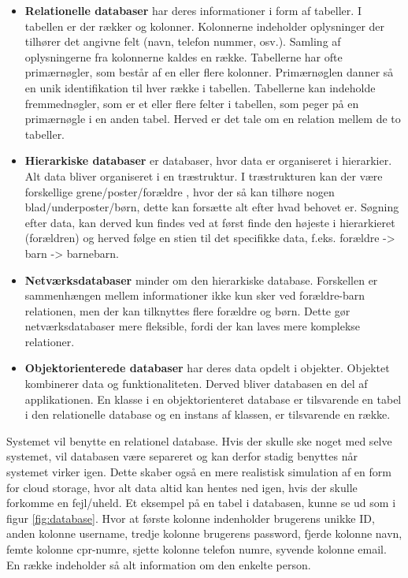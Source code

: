 \begin{itemize}
\item \textbf{Relationelle databaser} har deres informationer i form af tabeller. I tabellen er der rækker og kolonner. Kolonnerne indeholder oplysninger der tilhører det angivne felt (navn, telefon nummer, osv.). Samling af oplysningerne fra kolonnerne kaldes en række. Tabellerne har ofte primærnøgler, som består af en eller flere kolonner. Primærnøglen danner så en unik identifikation til hver række i tabellen. Tabellerne kan indeholde fremmednøgler, som er et eller flere felter i tabellen, som peger på en primærnøgle i en anden tabel. Herved er det tale om en relation mellem de to tabeller. \citep{reledata, database}
\item \textbf{Hierarkiske databaser} er databaser, hvor data er organiseret i hierarkier. Alt data bliver organiseret i en træstruktur. I træstrukturen kan der være forskellige grene/poster/forældre , hvor der så kan tilhøre nogen blad/underposter/børn, dette kan forsætte alt efter hvad behovet er. Søgning efter data, kan derved kun findes ved at først finde den højeste i hierarkieret (forældren) og herved følge en stien til det specifikke data, f.eks. forældre -> barn -> barnebarn. \citep{hierdata, database} 
\item \textbf{Netværksdatabaser} minder om den hierarkiske database. Forskellen er sammenhængen mellem informationer ikke kun sker ved forældre-barn relationen, men der kan tilknyttes flere forældre og børn. Dette gør netværksdatabaser mere fleksible, fordi der kan laves mere komplekse relationer. \citep{database, netdata}
\item \textbf{Objektorienterede databaser} har deres data opdelt i objekter. Objektet kombinerer data og funktionaliteten. Derved bliver databasen en del af applikationen. En klasse i en objektorienteret database er tilsvarende en tabel i den relationelle database og en instans af klassen, er tilsvarende en række. \citep{database}
\end{itemize}

Systemet vil benytte en relationel database. Hvis der skulle ske noget med selve systemet, vil databasen være separeret og kan derfor stadig benyttes når systemet virker igen. Dette skaber også en mere realistisk simulation af en form for cloud storage, hvor alt data altid kan hentes ned igen, hvis der skulle forkomme en fejl/uheld. Et eksempel på en tabel i databasen, kunne se ud som i figur \ref{fig:database}. Hvor at første kolonne indenholder brugerens unikke ID, anden kolonne username, tredje kolonne brugerens password, fjerde kolonne navn, femte kolonne cpr-numre, sjette kolonne telefon numre, syvende kolonne email. En række indeholder så alt information om den enkelte person.   

